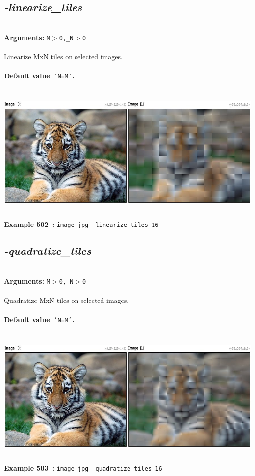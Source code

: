 \documentclass[a4paper,11pt,twoside]{book}
\begin{document}
\subsection{\emph{-linearize\_tiles} }\vspace*{-0.5em}
~\\\textbf{Arguments: } 
{\small \texttt{M$>$0,\_N$>$0}}\\~\\
Linearize MxN tiles on selected images.
~\\~\\\textbf{Default value}: {\small \texttt{'N=M'.}}
\begin{center}\includegraphics[keepaspectratio=true,height=7cm,width=\textwidth]{img/gmic_def502.jpg}\\
{\footnotesize \textbf{Example 502~:} \texttt{image.jpg --linearize\_tiles 16}}
\end{center}

\subsection{\emph{-quadratize\_tiles} }\vspace*{-0.5em}
~\\\textbf{Arguments: } 
{\small \texttt{M$>$0,\_N$>$0}}\\~\\
Quadratize MxN tiles on selected images.
~\\~\\\textbf{Default value}: {\small \texttt{'N=M'.}}
\begin{center}\includegraphics[keepaspectratio=true,height=7cm,width=\textwidth]{img/gmic_def503.jpg}\\
{\footnotesize \textbf{Example 503~:} \texttt{image.jpg --quadratize\_tiles 16}}
\end{center}
\end{document}
